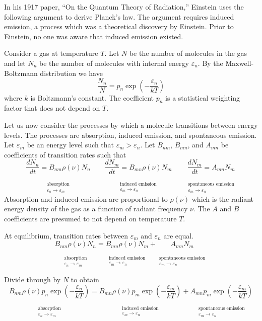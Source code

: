 \documentclass[12pt]{article}
\newcommand\BNM{B_{nm}} %
\newcommand\BMN{B_{mn}} %
\newcommand\AMN{A_{mn}} %
\newcommand\ABSORPTION{\substack{\phantom{0}\\ \text{absorption}\\ \varepsilon_n\rightarrow\varepsilon_m}}
\newcommand\INDUCED{\substack{\phantom{0}\\ \text{induced emission}\\ \varepsilon_m\rightarrow\varepsilon_n}}
\newcommand\SPONTANEOUS{\substack{\phantom{0}\\ \text{spontaneous emission}\\ \varepsilon_m\rightarrow\varepsilon_n}}
\begin{document}
\noindent
In his 1917 paper, ``On the Quantum Theory of Radiation,''
Einstein uses the following argument to derive Planck's law.
The argument requires induced emission, a process which was a theoretical discovery by Einstein.
Prior to Einstein, no one was aware that induced emission existed.

\bigskip
\noindent
Consider a gas at temperature $T$.
Let $N$ be the number of molecules in the gas
and let $N_n$ be the number of molecules with internal energy $\varepsilon_n$.
By the Maxwell-Boltzmann distribution we have
\begin{equation*}
\frac{N_n}{N}=p_n\exp\left(-\frac{\varepsilon_n}{kT}\right)
\end{equation*}
where $k$ is Boltzmann's constant.
The coefficient $p_n$ is a statistical weighting factor that does not depend on $T$.

\bigskip
\noindent
Let us now consider the processes by which a molecule transitions between energy levels.
The processes are absorption, induced emission, and spontaneous emission.
Let $\varepsilon_m$ be an energy level such that $\varepsilon_m>\varepsilon_n$.
Let $\BNM$, $\BMN$, and $\AMN$ be coefficients of transition rates such that
\begin{equation*}
\underset{\ABSORPTION}{\frac{dN_n}{dt}=\BNM\rho(\nu)N_n}
\qquad
\underset{\INDUCED}{\frac{dN_m}{dt}=\BMN\rho(\nu)N_m}
\qquad
\underset{\SPONTANEOUS}{\frac{dN_m}{dt}=\AMN N_m}
\end{equation*}
Absorption and induced emission are proportional to $\rho(\nu)$
which is the radiant energy density of the gas
as a function of radiant frequency $\nu$.
The $A$ and $B$ coefficients are presumed to not depend on temperature $T$.

\bigskip
\noindent
At equilibrium, transition rates between $\varepsilon_m$ and $\varepsilon_n$ are equal.
\begin{equation*}
\underset{\ABSORPTION}{\BNM\rho(\nu)N_n}
=\underset{\INDUCED}{\BMN\rho(\nu)N_m}
+\underset{\SPONTANEOUS}{\AMN N_m}
\end{equation*}

\noindent
Divide through by $N$ to obtain
\begin{equation*}
\underset{\ABSORPTION}{\BNM\rho(\nu)p_n\exp\left(-\frac{\varepsilon_n}{kT}\right)}
=\underset{\INDUCED}{\BMN\rho(\nu)p_m\exp\left(-\frac{\varepsilon_m}{kT}\right)}
+\underset{\SPONTANEOUS}{\AMN p_m\exp\left(-\frac{\varepsilon_m}{kT}\right)}
\end{equation*}
\end{document}
